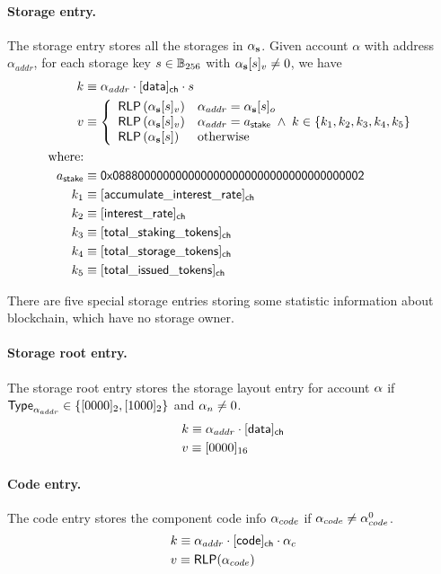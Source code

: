 \paragraph{Storage entry.} The storage entry stores all the storages in $\mathbf{\alpha}_{\bf s}$. Given account $\alpha$ with address $\alpha_{addr}$, for each storage key $s\in \mathbb{B}_{256}$ with $\mathbf{\alpha}_{\bf s}[s]_v\neq 0$, we have 
\begin{align}
	k&\eqdef \alpha_{addr}\cdot [{\sf data}]_{\sf ch}\cdot s \\
	v&\eqdef \left\{ \begin{array}{ll}
		\rlp\left(\account_{\bf s}[s]_v\right) & \alpha_{addr} = \account_{\bf s}[s]_o \\ 
		\rlp\left(\account_{\bf s}[s]_v\right) & \alpha_{addr} = a_{\sf stake} \;\wedge\; k \in \{k_1,k_2,k_3,k_4,k_5\} \\ 
		\rlp\left(\account_{\bf s}[s]\right) & \mbox{otherwise}
	\end{array}\right.\\
	\mbox{where:} &\\
	a_{\sf stake} &\eqdef \stakingcontract \\
	k_1 &\eqdef \sf [accumulate\char`_interest\char`_rate]_{\sf ch} \\ 
	k_2 &\eqdef \sf [interest\char`_rate]_{\sf ch} \\
    k_3 &\eqdef \sf [total\char`_staking\char`_tokens]_{\sf ch} \\
    k_4 &\eqdef \sf [total\char`_storage\char`_tokens]_{\sf ch} \\
    k_5 &\eqdef \sf [total\char`_issued\char`_tokens]_{\sf ch} 
\end{align}

There are five special storage entries storing some statistic information about \name blockchain, which have no storage owner. 

\paragraph{Storage root entry.} The storage root entry stores the storage layout entry for account $\mathbf{\alpha}$ if $\mathsf{Type}_{\mathbf{\alpha}_{addr}}\in \{[0000]_2,[1000]_2\}$ and $\mathbf{\alpha}_n\neq 0$. 
\begin{align}
	&k\equiv \alpha_{addr}\cdot [{\sf data}]_{\sf ch}\\
	&v\equiv [0000]_{16}
\end{align}

\paragraph{Code entry.} The code entry stores the component code info $\mathbf{\alpha}_{code}$ if $\mathbf{\alpha}_{code}\neq  \mathbf{\alpha}^0_{code}$. 
\begin{align}
	&k\equiv \alpha_{addr}\cdot [{\sf code}]_{\sf ch}\cdot \alpha_c  \\
	&v\equiv \mathsf{RLP}(\mathbf{\alpha}_{code})
\end{align}

